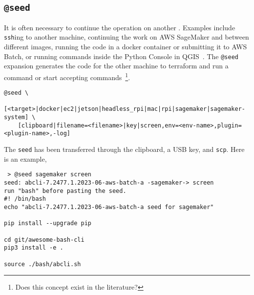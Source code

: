 \subsection{\texttt{@seed}}
\label{seed}

It is often necessary to continue the operation on another . Examples include \texttt{ssh}ing to another machine, continuing the work on AWS SageMaker and between different images, running the code in a docker container or submitting it to AWS Batch, or running commands inside the Python Console in QGIS~. The \texttt{@seed} expansion generates the code for the other machine to terraform and run a command or start accepting commands~\footnote{Does this concept exist in the literature?}.
%
\begin{verbatim}
@seed \
    [<target>|docker|ec2|jetson|headless_rpi|mac|rpi|sagemaker|sagemaker-system] \
    [clipboard|filename=<filename>|key|screen,env=<env-name>,plugin=<plugin-name>,-log]
\end{verbatim}
%
The \texttt{seed} has been transferred through the clipboard, a USB key, and \texttt{scp}. Here is an example,
%
\begin{verbatim}
 > @seed sagemaker screen
seed: abcli-7.2477.1.2023-06-aws-batch-a -sagemaker-> screen
run "bash" before pasting the seed.
#! /bin/bash
echo "abcli-7.2477.1.2023-06-aws-batch-a seed for sagemaker"

pip install --upgrade pip

cd git/awesome-bash-cli
pip3 install -e .

source ./bash/abcli.sh
\end{verbatim}